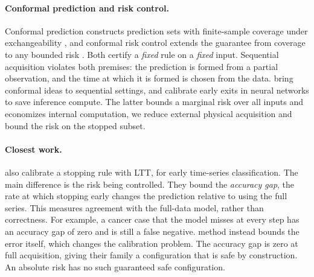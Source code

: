 \paragraph{Conformal prediction and risk control.}
Conformal prediction constructs prediction sets with finite-sample coverage under exchangeability \citep{shafer2008tutorial,angelopoulos2022}, and conformal risk control extends the guarantee from coverage to any bounded risk \citep{angelopoulos2022conformal}. Both certify a \emph{fixed} rule on a \emph{fixed} input. Sequential acquisition violates both premises: the prediction is formed from a partial observation, and the time at which it is formed is chosen from the data. \citet{gauthier2025values} bring conformal ideas to sequential settings, and \citet{jazbec2024fast} calibrate early exits in neural networks to save inference compute. The latter bounds a marginal risk over all inputs and economizes internal computation, we reduce external physical acquisition and bound the risk on the stopped subset.

\paragraph{Closest work.}
\citet{ringel2024early} also calibrate a stopping rule with LTT, for early time-series classification. 
The main difference is the risk being controlled. 
They bound the \emph{accuracy gap}, the rate at which stopping early changes the prediction relative to using the full series.
This measures agreement with the full-data model, rather than correctness. 
For example, a cancer case that the model misses at every step has an accuracy gap of zero and is still a false negative. 
\gls{method} instead bounds the error itself, which changes the calibration problem. 
The accuracy gap is zero at full acquisition, giving their family a configuration that is safe by construction. 
An absolute risk has no such guaranteed safe configuration.

